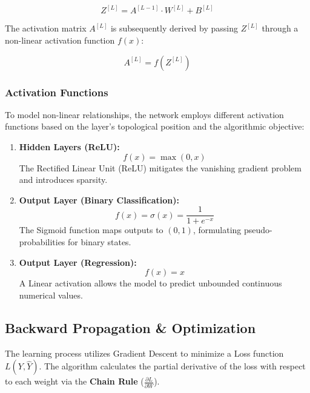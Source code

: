 \documentclass[11pt, a4paper]{article}
\begin{document}
\begin{equation}
Z^{[L]} = A^{[L-1]} \cdot W^{[L]} + B^{[L]}
\end{equation}

The activation matrix $A^{[L]}$ is subsequently derived by passing $Z^{[L]}$ through a non-linear activation function $f(x)$:

\begin{equation}
A^{[L]} = f(Z^{[L]})
\end{equation}

\subsubsection{Activation Functions}
To model non-linear relationships, the network employs different activation functions based on the layer's topological position and the algorithmic objective:

\begin{enumerate}
    \item \textbf{Hidden Layers (ReLU):} 
    \begin{equation}
    f(x) = \max(0, x)
    \end{equation}
    The Rectified Linear Unit (ReLU) mitigates the vanishing gradient problem and introduces sparsity.
    
    \item \textbf{Output Layer (Binary Classification):}
    \begin{equation}
    f(x) = \sigma(x) = \frac{1}{1 + e^{-x}}
    \end{equation}
    The Sigmoid function maps outputs to $(0, 1)$, formulating pseudo-probabilities for binary states.

    \item \textbf{Output Layer (Regression):}
    \begin{equation}
    f(x) = x
    \end{equation}
    A Linear activation allows the model to predict unbounded continuous numerical values.
\end{enumerate}

\subsection{Backward Propagation \& Optimization}
The learning process utilizes Gradient Descent to minimize a Loss function $L(Y, \hat{Y})$. The algorithm calculates the partial derivative of the loss with respect to each weight via the \textbf{Chain Rule} ($\frac{\partial L}{\partial W}$).
\end{document}

